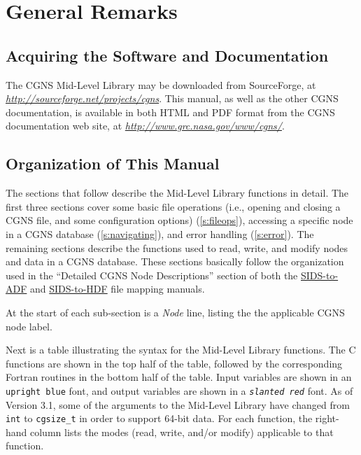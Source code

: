 \section{General Remarks}
\label{s:general}
\thispagestyle{plain}

\subsection{Acquiring the Software and Documentation}

The CGNS Mid-Level Library may be downloaded from SourceForge, at
{\itshape\url{http://sourceforge.net/projects/cgns}}.
This manual, as well as the other CGNS documentation, is available in
both HTML and PDF format from the CGNS documentation web site, at
{\itshape\url{http://www.grc.nasa.gov/www/cgns/}}.

\subsection{Organization of This Manual}

The sections that follow describe the Mid-Level Library functions
in detail.
The first three sections cover some basic file operations (i.e.,
opening and closing a CGNS file, and some configuration options)
(\autoref{s:fileops}), accessing a specific node in a CGNS database
(\autoref{s:navigating}), and error handling (\autoref{s:error}).
The remaining sections describe the functions used to read, write, and
modify nodes and data in a CGNS database.
These sections basically follow the organization used in
the ``Detailed CGNS Node Descriptions'' section of both the
\href{../filemap/filemap.pdf}{SIDS-to-ADF} and
\href{../filemap_hdf/filemap.pdf}{SIDS-to-HDF} file mapping manuals.

At the start of each sub-section is a \textit{Node} line, listing the
the applicable CGNS node label.

Next is a table illustrating the syntax for the Mid-Level Library
functions.
The C functions are shown in the top half of the table, followed by the
corresponding Fortran routines in the bottom half of the table.
Input variables are shown in an \textcolor{input}{\texttt{upright blue}}
font, and output variables are shown in a
\textcolor{output}{\texttt{\textit{slanted red}}} font.
As of Version 3.1, some of the arguments to the Mid-Level Library have
changed from \texttt{int} to \texttt{cgsize\_t} in order to support 64-bit data.
For each function, the right-hand column lists the modes (read, write,
and/or modify) applicable to that function.

